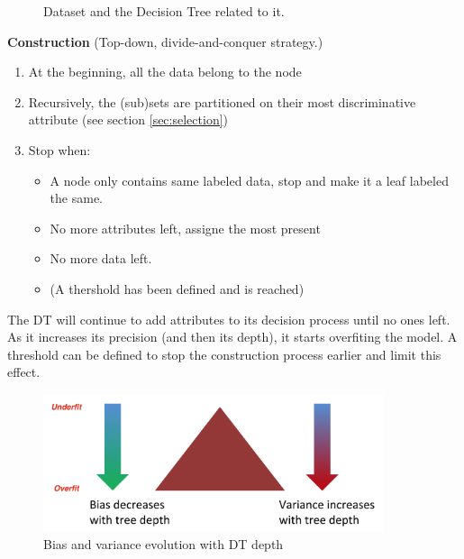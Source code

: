\begin{figure}[H] %
\centerline{
}
\caption{\label{DT} 
Dataset and the Decision Tree related to it.
}
\end{figure}

\textbf{Construction} (Top-down, divide-and-conquer strategy.)
\begin{enumerate}
  \item At the beginning, all the data belong to the node
  \item Recursively, the (sub)sets are partitioned on their most discriminative attribute (see section \ref{sec:selection})
  \item Stop when:
  \begin{itemize}
  	\item A node only contains same labeled data, stop and make it a leaf labeled the same.
  	\item No more attributes left, assigne the most present
  	\item No more data left.
  	\item (A thershold has been defined and is reached)
  \end{itemize}
\end{enumerate}

The DT will continue to add attributes to its decision process until no ones left. As it increases its precision (and then its depth), it starts overfiting the model. A threshold can be defined to stop the construction process earlier and limit this effect. 

\begin{figure}[H]%
 \centering
 \includegraphics[width=10cm]{./img/07/bias_variance_DT.png}
 \caption{\label{pic:bias_variance_DT.} Bias and variance evolution with DT depth}
\end{figure}

